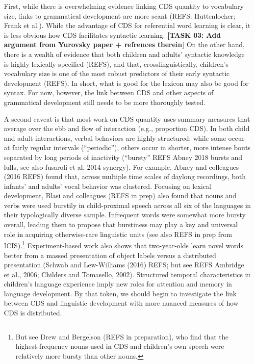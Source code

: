 \documentclass[floatsintext,man]{apa6}
\theoremstyle{definition}
\theoremstyle{definition}
\theoremstyle{definition}
\theoremstyle{remark}
\begin{document}
First, while there is overwhelming evidence linking CDS quantity to
vocabulary size, links to grammatical development are more scant (REFS:
Huttenlocher; Frank et al.). While the advantage of CDS for referential
word learning is clear, it is less obvious how CDS facilitates syntactic
learning. \textbf{{[}TASK 03: Add argument from Yurovsky paper +
refrences therein{]}} On the other hand, there is a wealth of evidence
that both children and adults' syntactic knowledge is highly lexically
specified (REFS), and that, crosslinguistically, children's vocabulary
size is one of the most robust predictors of their early syntactic
development (REFS). In short, what is good for the lexicon may also be
good for syntax. For now, however, the link between CDS and other
aspects of grammatical development still needs to be more thoroughly
tested.

A second caveat is that most work on CDS quantity uses summary measures
that average over the ebb and flow of interaction (e.g., proportion
CDS). In both child and adult interactions, verbal behaviors are highly
structured: while some occur at fairly regular intervals
(\enquote{periodic}), others occur in shorter, more intense bouts
separated by long periods of inactivity (\enquote{bursty} REFS Abney
2018 bursts and lulls, see also fusaroli et al. 2014 synergy). For
example, Abney and colleagues (2016 REFS) found that, across multiple
time scales of daylong recordings, both infants' and adults' vocal
behavior was clustered. Focusing on lexical development, Blasi and
colleagues (REFS in prep) also found that nouns and verbs were used
burstily in child-proximal speech across all six of the languages in
their typologically diverse sample. Infrequent words were somewhat more
bursty overall, leading them to propose that burstiness may play a key
and universal role in acquiring otherwise-rare linguistic units (see
also REFS in prep from
ICIS).\footnote{But see Drew and Bergelson (REFS in preparation), who find that the highest-frequency nouns used in CDS and children's own speech were relatively more bursty than other nouns.}
Experiment-based work also shows that two-year-olds learn novel words
better from a massed presentation of object labels versus a distributed
presentation (Schwab and Lew-Williams (2016) REFS; but see REFS Ambridge
et al., 2006; Childers and Tomasello, 2002). Structured temporal
characteristics in children's language experience imply new roles for
attention and memory in language development. By that token, we should
begin to investigate the link between CDS and linguistic development
with more nuanced measures of how CDS is distributed.
\end{document}

